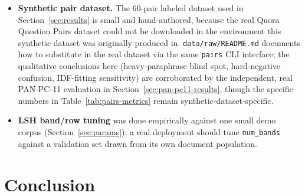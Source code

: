 \documentclass[11pt]{article}
\begin{document}
\begin{itemize}
          MinHash+LSH in Table~\ref{tab:pan-pc11-results} rather than appearing identical across its two
          columns.
    \item \textbf{Synthetic pair dataset.} The 60-pair labeled dataset used in Section~\ref{sec:results}
          is small and hand-authored, because the real Quora Question Pairs dataset could not be
          downloaded in the environment this synthetic dataset was originally produced in.
          \verb|data/raw/README.md| documents how to substitute in the real dataset via the same
          \texttt{pairs} CLI interface; the qualitative conclusions here (heavy-paraphrase blind spot,
          hard-negative confusion, IDF-fitting sensitivity) are corroborated by the independent, real
          PAN-PC-11 evaluation in Section~\ref{sec:pan-pc11-results}, though the specific numbers in
          Table~\ref{tab:pairs-metrics} remain synthetic-dataset-specific.
    \item \textbf{LSH band/row tuning} was done empirically against one small demo corpus
          (Section~\ref{sec:params}); a real deployment should tune \verb|num_bands| against a validation
          set drawn from its own document population.
\end{itemize}

\section{Conclusion}
\end{document}
